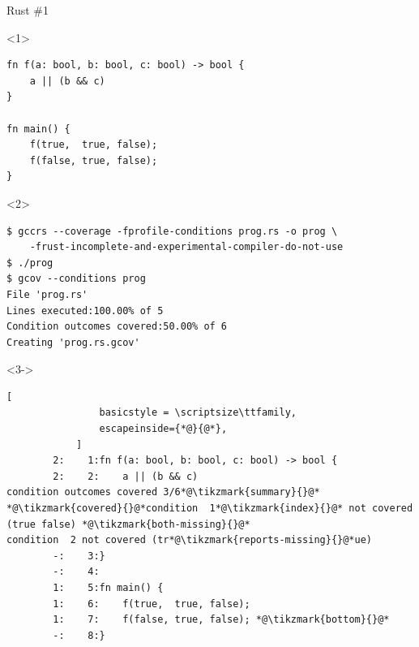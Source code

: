 \documentclass[xcolor = {dvipsnames, table}, aspectratio=169]{beamer}
\newcommand{\tikzmark}[2]{%
     \tikz[overlay,remember picture]%
        \node[text=black, inner sep=2pt] (#1) {#2};%
}
\begin{document}
\begin{frame}[fragile, t]
    \begin{block}{Rust \#1}
        \begin{onlyenv}<1>
            \begin{lstlisting}[basicstyle = \footnotesize\ttfamily]
fn f(a: bool, b: bool, c: bool) -> bool {
    a || (b && c)
}

fn main() {
    f(true,  true, false);
    f(false, true, false);
}
            \end{lstlisting}
        \end{onlyenv}

        \begin{onlyenv}<2>
            \begin{lstlisting}[basicstyle = \scriptsize\ttfamily]
$ gccrs --coverage -fprofile-conditions prog.rs -o prog \
    -frust-incomplete-and-experimental-compiler-do-not-use
$ ./prog
$ gcov --conditions prog
File 'prog.rs'
Lines executed:100.00% of 5
Condition outcomes covered:50.00% of 6
Creating 'prog.rs.gcov'
            \end{lstlisting}
        \end{onlyenv}

        \begin{onlyenv}<3->
            \begin{lstlisting}[
                basicstyle = \scriptsize\ttfamily,
                escapeinside={*@}{@*},
            ]
        2:    1:fn f(a: bool, b: bool, c: bool) -> bool {
        2:    2:    a || (b && c)
condition outcomes covered 3/6*@\tikzmark{summary}{}@*
*@\tikzmark{covered}{}@*condition  1*@\tikzmark{index}{}@* not covered (true false) *@\tikzmark{both-missing}{}@*
condition  2 not covered (tr*@\tikzmark{reports-missing}{}@*ue)
        -:    3:}
        -:    4:
        1:    5:fn main() {
        1:    6:    f(true,  true, false);
        1:    7:    f(false, true, false); *@\tikzmark{bottom}{}@*
        -:    8:}
            \end{lstlisting}

\end{onlyenv}
\end{block}
\end{frame}
\end{document}

